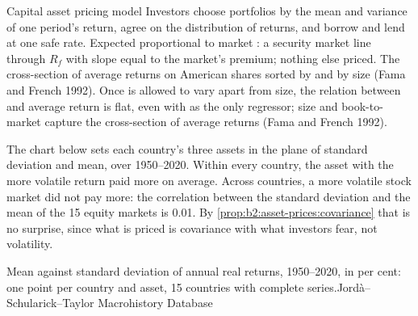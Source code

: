 \begin{model}{Capital asset pricing model}
\assumes Investors choose portfolios by the mean and variance of one period's return, agree on the
distribution of returns, and borrow and lend at one safe rate.
\predicts Expected  proportional to market : a security market line through $R_f$
with slope equal to the market's premium; nothing else priced.
\tested The cross-section of average returns on American shares sorted by  and by size (Fama and
French 1992).
\breaks Once  is allowed to vary apart from size, the relation between  and average return is
flat, even with  as the only regressor; size and book-to-market capture the cross-section of
average returns (Fama and French 1992).
\end{model}

The chart below sets each country's three assets in the plane of standard deviation and mean, over
1950--2020. Within every country, the asset with the more volatile return paid more on average. Across
countries, a more volatile stock market did not pay more: the correlation between the standard
deviation and the mean of the 15 equity markets is 0.01. By \cref{prop:b2:asset-prices:covariance}
that is no surprise, since what is priced is covariance with what investors fear, not volatility.

\begin{omchart}{Mean against standard deviation of annual real returns, 1950--2020, in per cent: one
  point per country and asset, 15 countries with complete series.}{Jord\`a--Schularick--Taylor
  Macrohistory Database}
\end{omchart}

